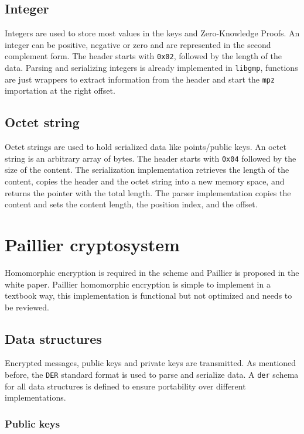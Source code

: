 \subsection{Integer}

Integers are used to store most values in the keys and Zero-Knowledge
Proofs. An integer can be positive, negative or zero and are represented in the
second complement form. The header starts with \texttt{0x02}, followed by the
length of the data. Parsing and serializing integers is already implemented in
\texttt{libgmp}, functions are just wrappers to extract information from the
header and start the \texttt{mpz} importation at the right offset.

\subsection{Octet string}

Octet strings are used to hold serialized data like points/public keys. An
octet string is an arbitrary array of bytes. The header starts with
\texttt{0x04} followed by the size of the content. The serialization
implementation retrieves the length of the content, copies the header and the
octet string into a new memory space, and returns the pointer with the total
length. The parser implementation copies the content and sets the content length,
the position index, and the offset.

\section{Paillier cryptosystem}

Homomorphic encryption is required in the scheme and Paillier is proposed in the
white paper. Paillier homomorphic encryption is simple to implement in a
textbook way, this implementation is functional but not optimized and needs to
be reviewed.

\subsection{Data structures}

Encrypted messages, public keys and private keys are transmitted. As mentioned before,
the \texttt{DER} standard format is used to parse and serialize data. A
\texttt{der} schema for all data structures is defined to ensure portability
over different implementations.

\subsubsection{Public keys}

